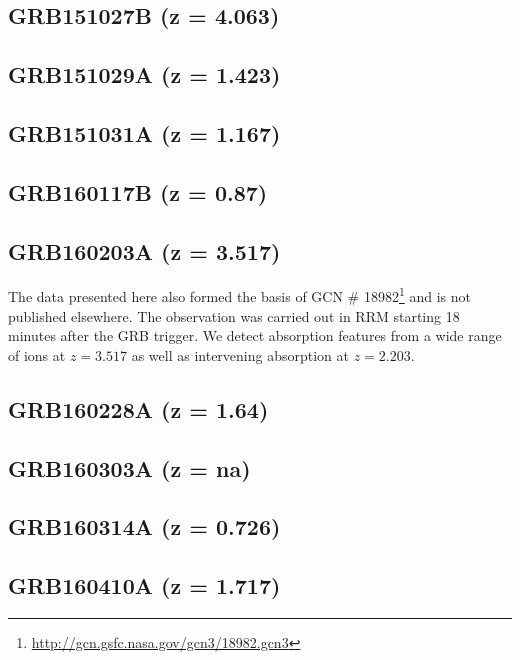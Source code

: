 \documentclass{aa}    %
\begin{document}
\subsection{GRB151027B (z = 4.063)}	



\subsection{GRB151029A (z = 1.423)}	



\subsection{GRB151031A (z = 1.167)}	



\subsection{GRB160117B (z = 0.87)}	



\subsection{GRB160203A (z = 3.517)}
The data presented here also formed the basis of GCN \#
18982\footnote{\url{http://gcn.gsfc.nasa.gov/gcn3/18982.gcn3}} and is not
published elsewhere. The observation was carried out in RRM starting 18 minutes
after the GRB trigger. We detect absorption features from a wide range of ions
at $z=3.517$ as well as intervening absorption at $z=2.203$.

\subsection{GRB160228A (z = 1.64)}	



\subsection{GRB160303A (z = na)}	



\subsection{GRB160314A (z = 0.726)}	



\subsection{GRB160410A (z = 1.717)}	
\end{document}
